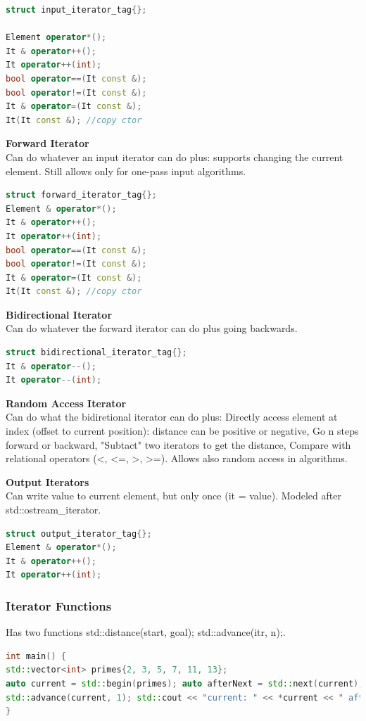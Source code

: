 \begin{lstlisting}[language=C++]
struct input_iterator_tag{};

Element operator*();
It & operator++(); 
It operator++(int); 
bool operator==(It const &); 
bool operator!=(It const &); 
It & operator=(It const &); 
It(It const &); //copy ctor
\end{lstlisting}

\textbf{Forward Iterator} \\
Can do whatever an input iterator can do plus: supports changing the current element. Still allows only for one-pass input algorithms.
\begin{lstlisting}[language=C++]
struct forward_iterator_tag{};
Element & operator*(); 
It & operator++(); 
It operator++(int); 
bool operator==(It const &); 
bool operator!=(It const &); 
It & operator=(It const &); 
It(It const &); //copy ctor
\end{lstlisting} 

\textbf{Bidirectional Iterator}\\
Can do whatever the forward iterator can do plus going backwards.
\begin{lstlisting}[language=C++]
struct bidirectional_iterator_tag{};
It & operator--(); 
It operator--(int); 
\end{lstlisting}

\textbf{Random Access Iterator} \\
Can do what the bidiretional iterator can do plus: Directly access element at index (offset to current position): distance can be positive or negative, Go n steps forward or backward, "Subtact" two iterators to get the distance, Compare with relational operators (<, <=, >, >=).
 Allows also random access in algorithms.

\textbf{Output Iterators} \\
 Can write value to current element, but only once (\*it = value).  Modeled after std::ostream\_iterator. 

\begin{lstlisting}[language=C++]
struct output_iterator_tag{};
Element & operator*(); 
It & operator++(); 
It operator++(int);
\end{lstlisting}

\subsubsection{Iterator Functions}
Has two functions std::distance(start, goal); std::advance(itr, n);.

\begin{lstlisting}[language=C++]
int main() {
std::vector<int> primes{2, 3, 5, 7, 11, 13};
auto current = std::begin(primes); auto afterNext = std::next(current); std::cout << "current: " << *current << " afterNext: " << *afterNext << '\n';
std::advance(current, 1); std::cout << "current: " << *current << " afterNext: " << *afterNext << '\n';
}
\end{lstlisting}


\pagebreak
